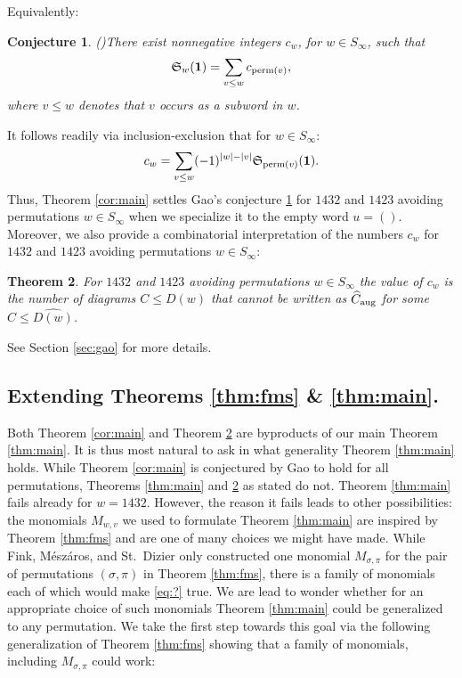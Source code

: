 \documentclass{amsart}
\newtheorem{theorem}{Theorem}[section]
\newtheorem{conjecture}[theorem]{Conjecture}
\theoremstyle{definition}
\theoremstyle{named}
\newcommand*{\Schub}{\mathfrak{S}}
\DeclareMathOperator*{\perm}{perm}
\begin{document}
Equivalently:

	\begin{conjecture}(\cite[Conjecture 3.2]{Gao})\label{conj:gao} There exist nonnegative integers $c_w$, for $w \in S_{\infty}$, such that    $$\Schub_w({\bf 1})=\sum_{v \leq w} c_{{\rm perm}(v)},$$ where  
$v \leq w$ denotes that $v$ occurs as a subword in $w$. 
	\end{conjecture}

	It follows readily via inclusion-exclusion that 
	for $w \in S_{\infty}$:   \begin{equation} \label{eq:cw} c_w=\sum_{v \le w} (-1)^{\left|w\right|-\left|v\right|} \Schub_{\perm(v)}(\bf{1}).\end{equation} Thus, Theorem \ref{cor:main} settles Gao's conjecture \ref{conj:gao} for $1432$ and $1423$ avoiding permutations  $w \in S_{\infty}$ when we specialize it to the empty word $u=()$. Moreover, we also 
	provide a combinatorial interpretation of the numbers $c_w$ for $1432$ and $1423$ avoiding permutations  $w \in S_{\infty}$:

	\begin{theorem} \label{thm:cw}  For $1432$ and $1423$ avoiding permutations  $w \in S_{\infty}$ the value of $c_w$ is the number of diagrams $C \le D(w)$ that cannot be written as $\widehat{C}_\textup{aug}$ for some $\widehat{C} \le \widehat{D(w)}$.  	\end{theorem}

	See  Section \ref{sec:gao} for more details.

	\medskip

	\subsection{Extending Theorems \ref{thm:fms} \& \ref{thm:main}.} Both Theorem \ref{cor:main} and Theorem \ref{thm:cw} are byproducts of our main Theorem \ref{thm:main}. It is thus most natural to ask in what generality  Theorem \ref{thm:main} holds. While Theorem \ref{cor:main} is conjectured by Gao to hold for all permutations, Theorems \ref{thm:main} and 	\ref{thm:cw} as stated do not. Theorem \ref{thm:main} fails already for $w=1432$. However, the reason it fails leads to other possibilities: the  monomials $M_{w,v}$ we used to formulate Theorem \ref{thm:main} are inspired by Theorem \ref{thm:fms} and  are one of many choices we might have made.   While Fink, M\'esz\'aros, and St.~Dizier  \cite{zeroone} only constructed one monomial $M_{\sigma, \pi}$ for the pair of permutations $(\sigma, \pi)$ in Theorem \ref{thm:fms},   there is a family of  monomials each of which would make \eqref{eq:?} true. We are lead to wonder whether  for an appropriate choice of such monomials Theorem \ref{thm:main} could be generalized to any permutation. We take the first step towards this goal  via the following generalization of   Theorem \ref{thm:fms} showing that a family of monomials, including $M_{\sigma, \pi}$ could work:
\end{document}
